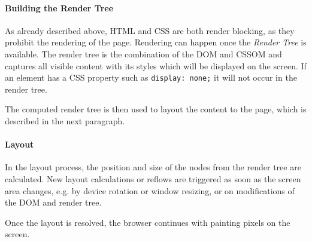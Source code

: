



\paragraph{Building the Render Tree}


As already described above, HTML and CSS are both render blocking, as they prohibit the rendering of the page.
Rendering can happen once the \textit{Render Tree} is available.
The render tree is the combination of the DOM and CSSOM and captures all visible content with its styles which will be displayed on the screen.
If an element has a CSS property such as \verb|display: none;| it will not occur in the render tree. %

The computed render tree is then used to layout the content to the page, which is described in the next paragraph.








\paragraph{Layout}



In the layout process, the position and size of the nodes from the render tree are calculated.
New layout calculations or reflows are triggered as soon as the screen area changes, e.g. by device rotation or window resizing, or on modifications of the DOM and render tree. %

Once the layout is resolved, the browser continues with painting pixels on the screen.






